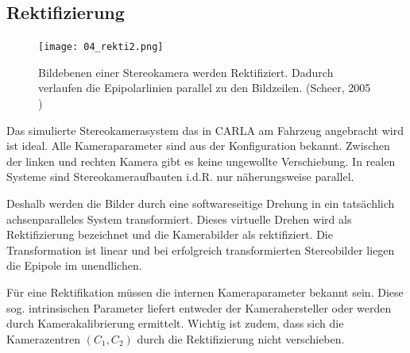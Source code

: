 \subsection{Rektifizierung}
\begin{figure}[!ht]
  \centering
  \texttt{[image: 04\_rekti2.png]}
  \caption[Rektifikation der Stereobildebenen]{Bildebenen einer Stereokamera werden Rektifiziert. Dadurch verlaufen die Epipolarlinien parallel zu den Bildzeilen. (Scheer, 2005 \cite{stereoSchreer})}
\end{figure}
   
Das simulierte Stereokamerasystem das in CARLA am Fahrzeug angebracht wird ist ideal. Alle Kameraparameter sind aus der Konfiguration bekannt. Zwischen der linken und rechten Kamera gibt es keine ungewollte Verschiebung. In realen Systeme sind Stereokameraufbauten i.d.R. nur näherungsweise parallel.

Deshalb werden die Bilder durch eine softwareseitige Drehung in ein tatsächlich achsenparalleles System transformiert. Dieses virtuelle Drehen wird als Rektifizierung bezeichnet und die Kamerabilder als rektifiziert. Die Transformation ist linear und bei erfolgreich transformierten Stereobilder liegen die Epipole im unendlichen. 

Für eine Rektifikation müssen die internen Kameraparameter bekannt sein. Diese sog. intrinsischen Parameter liefert entweder der Kamerahersteller oder werden durch Kamerakalibrierung ermittelt. Wichtig ist zudem, dass sich die Kamerazentren $(C_1 , C_2)$ durch die Rektifizierung nicht verschieben. 